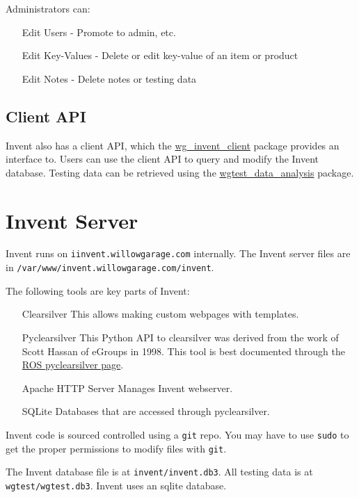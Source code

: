 \documentclass[11pt]{book}
\begin{document}
Administrators can:
\begin{itemize}
\item[Edit Users] - Promote to admin, etc.
\item[Edit Key-Values] - Delete or edit key-value of an item or product
\item[Edit Notes] - Delete notes or testing data
\end{itemize}

\subsection{Client API}

Invent also has a client API, which the \href{http://www.ros.org/wiki/wg\_invent\_client}{wg\_invent\_client} package provides an interface to. Users can use the client API to query and modify the Invent database. Testing data can be retrieved using the \href{http://www.ros.org/wiki/wgtest\_data\_analysis}{wgtest\_data\_analysis} package.


\section {Invent Server}

Invent runs on \texttt{iinvent.willowgarage.com} internally. The Invent server files are in \texttt{/var/www/invent.willowgarage.com/invent}. 

The following tools are key parts of Invent:
\begin{itemize}
\item [Clearsilver] This allows making custom webpages with templates.
\item [Pyclearsilver] This Python API to clearsilver was derived from the work of Scott Hassan of eGroups in 1998. This tool is best documented through the \href{http://www.ros.org/wiki/pyclearsilver}{ROS pyclearsilver page}.
\item [Apache HTTP Server] Manages Invent webserver.
\item [SQLite] Databases that are accessed through pyclearsilver.
\end{itemize}

Invent code is sourced controlled using a \texttt{git} repo. You may have to use \texttt{sudo} to get the proper permissions to modify files with \texttt{git}.

The Invent database file is at \texttt{invent/invent.db3}. All testing data is at \texttt{wgtest/wgtest.db3}. Invent uses an sqlite database.
\end{document}
